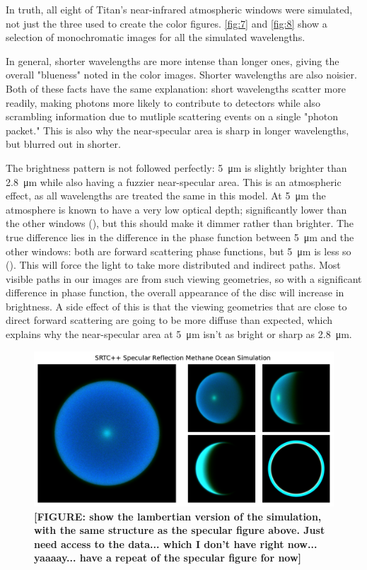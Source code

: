 \documentclass{article}
\begin{document}
In truth, all eight of Titan's near-infrared atmospheric windows were simulated, not just the three used to create the color figures. \ref{fig:7} and \ref{fig:8} show a selection of monochromatic images for all the simulated wavelengths. 

In general, shorter wavelengths are more intense than longer ones, giving the overall "blueness" noted in the color images. Shorter wavelengths are also noisier. Both of these facts have the same explanation: short wavelengths scatter more readily, making photons more likely to contribute to detectors while also scrambling information due to mutliple scattering events on a single "photon packet." This is also why the near-specular area is sharp in longer wavelengths, but blurred out in shorter.

The brightness pattern is not followed perfectly: \qty{5}{\micro\meter} is slightly brighter than \qty{2.8}{\micro\meter} while also having a fuzzier near-specular area. This is an atmospheric effect, as all wavelengths are treated the same in this model. At \qty{5}{\micro\meter} the atmosphere is known to have a very low optical depth; significantly lower than the other windows (\cite{EsSayeh2023}), but this should make it dimmer rather than brighter. The true difference lies in the difference in the phase function between \qty{5}{\micro\meter} and the other windows: both are forward scattering phase functions, but \qty{5}{\micro\meter} is less so (\cite{Tomasko2008}). This will force the light to take more distributed and indirect paths. Most visible paths in our images are from such viewing geometries, so with a significant difference in phase function, the overall appearance of the disc will increase in brightness. A side effect of this is that the viewing geometries that are close to direct forward scattering are going to be more diffuse than expected, which explains why the near-specular area at \qty{5}{\micro\meter} isn't as bright or sharp as \qty{2.8}{\micro\meter}. 

\begin{figure}[htb]
\includegraphics[scale = 0.5]{SpecularSim.pdf}
\centering
\caption{\textbf{\color{red} [FIGURE: show the lambertian version of the simulation, with the same structure as the specular figure above. Just need access to the data... which I don't have right now... yaaaay... have a repeat of the specular figure for now] \color{black}}}
\label{fig:9}
\end{figure}
\end{document}
